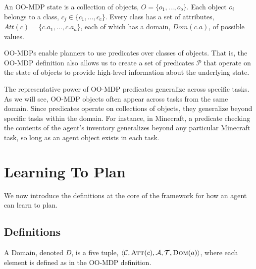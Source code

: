 \documentclass[11pt]{article}
\begin{document}
An OO-MDP state is a collection of objects, $O = \{o_1, \ldots, o_o \}$.  Each object
$o_i$ belongs to a class, $c_j \in \{c_1, \ldots, c_c\}$. Every class
has a set of attributes, $Att(c) = \{c.a_1, \ldots, c.a_a \}$, each of
which has a domain, $Dom(c.a)$, of possible values. 

OO-MDPs enable planners to use predicates over classes of objects. That is, the
OO-MDP definition also allows us to create a set of predicates $\mathcal{P}$ that
operate on the state of objects to provide high-level
information about the underlying state.

The representative power of OO-MDP predicates generalize across specific tasks. As we will see, OO-MDP objects
often appear across tasks from the same domain. Since predicates operate on collections
of objects, they generalize beyond specific tasks within the domain.
For instance, in Minecraft, a predicate checking the contents of the agent's inventory
generalizes beyond any particular Minecraft task, so long as an agent object exists in each task.
%
%
%


\section{Learning To Plan}
\label{sec:learning_to_plan}

We now introduce the definitions at the core of the framework for how an agent can learn to plan. \\

\subsection{Definitions}
{ A \textup{Domain}, denoted $D$, is a five tuple, $\langle \mathcal{C}, \textsc{Att}(c), \mathcal{A}, \mathcal{T}, \textsc{Dom}(a) \rangle$, where each element is defined as in the OO-MDP definition.} 

\end{document}
